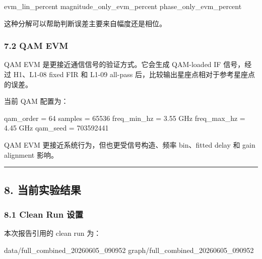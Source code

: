 \documentclass[
]{ctexart}
\newenvironment{Shaded}{}{}
\newcommand{\NormalTok}[1]{#1}
\begin{document}
\begin{Shaded}
\begin{Highlighting}[]
\NormalTok{evm\_lin\_percent}
\NormalTok{magnitude\_only\_evm\_percent}
\NormalTok{phase\_only\_evm\_percent}
\end{Highlighting}
\end{Shaded}

这种分解可以帮助判断误差主要来自幅度还是相位。

\subsubsection{7.2 QAM EVM}\label{qam-evm}

QAM EVM 是更接近通信信号的验证方式。它会生成 QAM-loaded IF 信号，经过
H1、L1-08 fixed FIR 和 L1-09 all-pass
后，比较输出星座点相对于参考星座点的误差。

当前 QAM 配置为：

\begin{Shaded}
\begin{Highlighting}[]
\NormalTok{qam\_order = 64}
\NormalTok{samples = 65536}
\NormalTok{freq\_min\_hz = 3.55 GHz}
\NormalTok{freq\_max\_hz = 4.45 GHz}
\NormalTok{qam\_seed = 703592441}
\end{Highlighting}
\end{Shaded}

QAM EVM 更接近系统行为，但也更受信号构造、频率 bin、fitted delay 和 gain
alignment 影响。

\begin{center}\rule{0.5\linewidth}{0.5pt}\end{center}

\subsection{8. 当前实验结果}\label{ux5f53ux524dux5b9eux9a8cux7ed3ux679c}

\subsubsection{8.1 Clean Run 设置}\label{clean-run-ux8bbeux7f6e}

本次报告引用的 clean run 为：

\begin{Shaded}
\begin{Highlighting}[]
\NormalTok{data/full\_combined\_20260605\_090952}
\NormalTok{graph/full\_combined\_20260605\_090952}
\end{Highlighting}
\end{Shaded}
\end{document}

